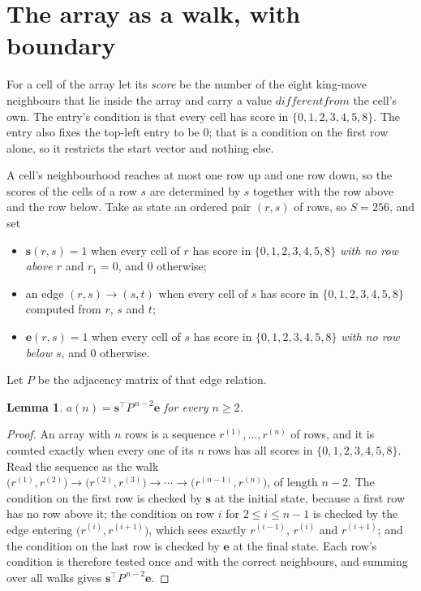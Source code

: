 \documentclass[11pt,a4paper]{article}
\theoremstyle{plain}
\newtheorem{lemma}[theorem]{Lemma}
\theoremstyle{definition}
\begin{document}
\section{The array as a walk, with boundary}

For a cell of the array let its \emph{score} be the number of the eight king-move neighbours that lie inside
the array and carry a value $different from$ the cell's own. The entry's condition is that every cell
has score in $\{0,1,2,3,4,5,8\}$. The entry also fixes the top-left entry to be $0$; that is a condition on the first row alone, so it restricts the start vector and nothing else.

A cell's neighbourhood reaches at most one row up and one row down, so the scores of the
cells of a row $s$ are determined by $s$ together with the row above and the row below.
Take as state an ordered pair $(r,s)$ of rows, so $S=256$, and set
\begin{itemize}
\item $\mathbf{s}(r,s)=1$ when every cell of $r$ has score in $\{0,1,2,3,4,5,8\}$ \emph{with no row
above $r$} and $r_1=0$, and $0$ otherwise;
\item an edge $(r,s)\to(s,t)$ when every cell of $s$ has score in $\{0,1,2,3,4,5,8\}$ computed from
$r$, $s$ and $t$;
\item $\mathbf{e}(r,s)=1$ when every cell of $s$ has score in $\{0,1,2,3,4,5,8\}$ \emph{with no row
below $s$}, and $0$ otherwise.
\end{itemize}
Let $P$ be the adjacency matrix of that edge relation.

\begin{lemma}\label{lem:walk}
$a(n)=\mathbf{s}^{\!\top}P^{\,n-2}\mathbf{e}$ for every $n\ge2$.
\end{lemma}

\begin{proof}
An array with $n$ rows is a sequence $r^{(1)},\dots,r^{(n)}$ of rows, and it is counted
exactly when every one of its $n$ rows has all scores in $\{0,1,2,3,4,5,8\}$. Read the sequence as the
walk $\bigl(r^{(1)},r^{(2)}\bigr)\to\bigl(r^{(2)},r^{(3)}\bigr)\to\cdots\to
\bigl(r^{(n-1)},r^{(n)}\bigr)$, of length $n-2$. The condition on the first row is
checked by $\mathbf{s}$ at the initial state, because a first row has no row above it; the
condition on row $i$ for $2\le i\le n-1$ is checked by the edge entering
$\bigl(r^{(i)},r^{(i+1)}\bigr)$, which sees exactly $r^{(i-1)}$, $r^{(i)}$ and
$r^{(i+1)}$; and the condition on the last row is checked by $\mathbf{e}$ at the final
state. Each row's condition is therefore tested once and with the correct neighbours, and
summing over all walks gives $\mathbf{s}^{\!\top}P^{\,n-2}\mathbf{e}$.
\end{proof}
\end{document}
